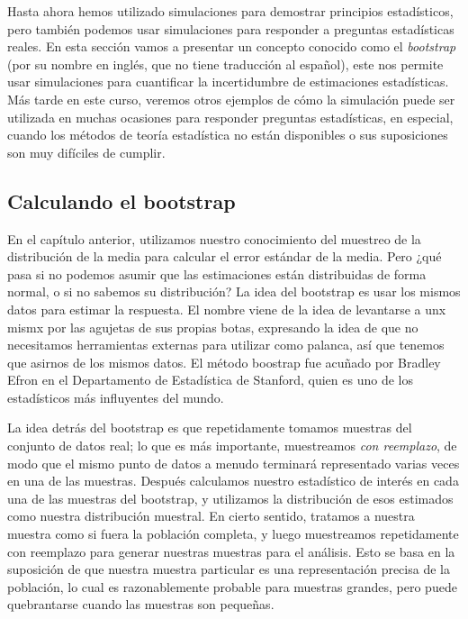 \documentclass[
  12pt,
]{book}
\begin{document}
Hasta ahora hemos utilizado simulaciones para demostrar principios estadísticos, pero también podemos usar simulaciones para responder a preguntas estadísticas reales. En esta sección vamos a presentar un concepto conocido como el \emph{bootstrap} (por su nombre en inglés, que no tiene traducción al español), este nos permite usar simulaciones para cuantificar la incertidumbre de estimaciones estadísticas. Más tarde en este curso, veremos otros ejemplos de cómo la simulación puede ser utilizada en muchas ocasiones para responder preguntas estadísticas, en especial, cuando los métodos de teoría estadística no están disponibles o sus suposiciones son muy difíciles de cumplir.

\hypertarget{calculando-el-bootstrap}{%
\subsection{Calculando el bootstrap}\label{calculando-el-bootstrap}}

En el capítulo anterior, utilizamos nuestro conocimiento del muestreo de la distribución de la media para calcular el error estándar de la media. Pero ¿qué pasa si no podemos asumir que las estimaciones están distribuidas de forma normal, o si no sabemos su distribución? La idea del bootstrap es usar los mismos datos para estimar la respuesta. El nombre viene de la idea de levantarse a unx mismx por las agujetas de sus propias botas, expresando la idea de que no necesitamos herramientas externas para utilizar como palanca, así que tenemos que asirnos de los mismos datos. El método boostrap fue acuñado por Bradley Efron en el Departamento de Estadística de Stanford, quien es uno de los estadísticos más influyentes del mundo.

La idea detrás del bootstrap es que repetidamente tomamos muestras del conjunto de datos real; lo que es más importante, muestreamos \emph{con reemplazo}, de modo que el mismo punto de datos a menudo terminará representado varias veces en una de las muestras. Después calculamos nuestro estadístico de interés en cada una de las muestras del bootstrap, y utilizamos la distribución de esos estimados como nuestra distribución muestral. En cierto sentido, tratamos a nuestra muestra como si fuera la población completa, y luego muestreamos repetidamente con reemplazo para generar nuestras muestras para el análisis. Esto se basa en la suposición de que nuestra muestra particular es una representación precisa de la población, lo cual es razonablemente probable para muestras grandes, pero puede quebrantarse cuando las muestras son pequeñas.
\end{document}
